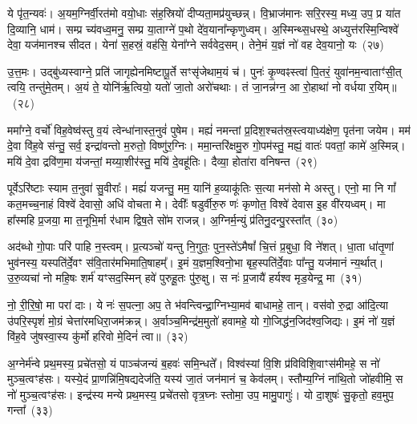 ये पृ॑त॒न्यवः॑। अ॒यम॒ग्निर्वी॒रत॑मो वयो॒धाः स॑ह॒स्रियो॑ दीप्यता॒मप्र॑युच्छन्न्। वि॒भ्राज॑मानः सरि॒रस्य॒ मध्य॒ उप॒ प्र या॑त दि॒व्यानि॒ धाम॑। सम्प्र च्य॑वध्व॒मनु॒ सम्प्र या॒ताग्ने॑ प॒थो दे॑व॒याना᳚न्कृणुध्वम्। अ॒स्मिन्थ्स॒धस्थे॒ अध्युत्त॑रस्मि॒न्विश्वे॑ देवा॒ यज॑मानश्च सीदत। येना॑ स॒हस्रं॒ वह॑सि॒ येना᳚ग्ने सर्ववेद॒सम्। तेने॒मं य॒ज्ञं नो॑ वह देव॒यानो॒ यः~(२७)

उ॒त्त॒मः। उद्बु॑ध्यस्वाग्ने॒ प्रति॑ जागृह्येनमिष्टापू॒र्ते सꣳसृ॑जेथाम॒यं च॑। पुनः॑ कृ॒ण्वꣴस्त्वा॑ पि॒तरं॒ युवा॑नम॒न्वाताꣳ॑सी॒त् त्वयि॒ तन्तु॑मे॒तम्। अ॒यं ते॒ योनि॑र्\mbox{}ऋ॒त्वियो॒ यतो॑ जा॒तो अरो॑चथाः। तं जा॒नन्न॑ग्न॒ आ रो॒हाथा॑ नो वर्धया र॒यिम्॥~(२८)

{\anuvakamend[{ध्रु॒वः स॒त्रं कृ॑णुते॒ यः स॒प्तत्रिꣳ॑शच्च}]}%

ममा᳚ग्ने॒ वर्चो॑ विह॒वेष्व॑स्तु व॒यं त्वेन्धा॑नास्त॒नुवं॑ पुषेम। मह्यं॑ नमन्तां प्र॒दिश॒श्चत॑स्र॒स्त्वयाध्य॑क्षेण॒ पृत॑ना जयेम। मम॑ दे॒वा वि॑ह॒वे स॑न्तु॒ सर्व॒ इन्द्रा॑वन्तो म॒रुतो॒ विष्णु॑र॒ग्निः। ममा॒न्तरि॑क्षमु॒रु गो॒पम॑स्तु॒ मह्यं॒ वातः॑ पवतां॒ कामे॑ अ॒स्मिन्न्। मयि॑ दे॒वा द्रवि॑ण॒मा य॑जन्तां॒ मय्या॒शीर॑स्तु॒ मयि॑ दे॒वहू॑तिः। दैव्या॒ होता॑रा वनिषन्त~(२९)

पूर्वे\-ऽरि॑ष्टाः स्याम त॒नुवा॑ सु॒वीराः᳚। मह्यं॑ यजन्तु॒ मम॒ यानि॑ ह॒व्याकू॑तिः स॒त्या मन॑सो मे अस्तु। एनो॒ मा नि गां᳚ कत॒मच्च॒नाहं विश्वे॑ देवासो॒ अधि॑ वोचता मे। देवीः᳚ षडुर्वीरु॒रु णः॑ कृणोत॒ विश्वे॑ देवास इ॒ह वी॑रयध्वम्। मा हा᳚स्महि प्र॒जया॒ मा त॒नूभि॒र्मा र॑धाम द्विष॒ते सो॑म राजन्न्। अ॒ग्निर्म॒न्युं प्र॑तिनु॒दन्पु॒रस्ता᳚त्~(३०)

अद॑ब्धो गो॒पाः परि॑ पाहि न॒स्त्वम्। प्र॒त्यञ्चो॑ यन्तु नि॒गुतः॒ पुन॒स्ते॑\-ऽमैषां᳚ चि॒त्तं प्र॒बुधा॒ वि ने॑शत्। धा॒ता धा॑तृ॒णां भुव॑नस्य॒ यस्पति॑र्दे॒वꣳ स॑वि॒तार॑मभिमाति॒षाहम्᳚। इ॒मं य॒ज्ञम॒श्विनो॒भा बृह॒स्पति॑र्दे॒वाः पा᳚न्तु॒ यज॑मानं न्य॒र्थात्। उ॒रु॒व्यचा॑ नो महि॒षः शर्म॑ यꣳसद॒स्मिन् हवे॑ पुरुहू॒तः पु॑रु॒क्षु। स नः॑ प्र॒जायै॑ हर्यश्व मृड॒येन्द्र॒ मा~(३१)

नो॒ री॒रि॒षो॒ मा परा॑ दाः। ये नः॑ स॒पत्ना॒ अप॒ ते भ॑वन्त्विन्द्रा॒ग्निभ्या॒मव॑ बाधामहे॒ तान्। वस॑वो रु॒द्रा आ॑दि॒त्या उ॑परि॒स्पृशं॑ मो॒ग्रं चेत्ता॑रमधिरा॒जम॑क्रन्न्। अ॒र्वाञ्च॒मिन्द्र॑म॒मुतो॑ हवामहे॒ यो गो॒जिद्ध॑न॒जिद॑श्व॒जिद्यः। इ॒मं नो॑ य॒ज्ञं वि॑ह॒वे जु॑षस्वा॒स्य कु॑र्मो हरिवो मे॒दिनं॑ त्वा॥~(३२)

{\anuvakamend[{व॒नि॒ष॒न्त॒ पु॒रस्ता॒न्मा त्रिच॑त्वारिꣳशच्च}]}%

अ॒ग्नेर्म॑न्वे प्रथ॒मस्य॒ प्रचे॑तसो॒ यं पाञ्च॑जन्यं ब॒हवः॑ समि॒न्धते᳚। विश्व॑स्यां वि॒शि प्र॑विविशि॒वाꣳस॑मीमहे॒ स नो॑ मुञ्च॒त्वꣳह॑सः। यस्ये॒दं प्रा॒णन्नि॑मि॒षद्यदेज॑ति॒ यस्य॑ जा॒तं जन॑मानं च॒ केव॑लम्। स्तौम्य॒ग्निं ना॑थि॒तो जो॑हवीमि॒ स नो॑ मुञ्च॒त्वꣳह॑सः। इन्द्र॑स्य मन्ये प्रथ॒मस्य॒ प्रचे॑तसो वृत्र॒घ्नः स्तोमा॒ उप॒ मामु॒पागुः॑। यो दा॒शुषः॑ सु॒कृतो॒ हव॒मुप॒ गन्ता᳚~(३३)

